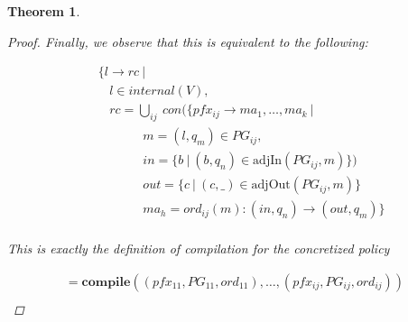 \documentclass[twocolumn]{sig-alternate-10pt}
\newtheorem{thm}{Theorem}[section]
\begin{document}
\begin{thm}
\begin{proof}
  Finally, we observe that this is equivalent to the following:

  \[ \begin{array}{l}
     ~~~~~ \{ l \rightarrow rc ~\vert~ \\
     ~~~~~~~~~ l \in internal(V), \\
     ~~~~~~~~~ rc = \bigcup_{ij}~ con(\{ pfx_{ij} \rightarrow ma_1, \dots, ma_k ~\vert~ \\
     ~~~~~~~~~~~~~~~~~~~~~ m = (l,q_m) \in PG_{ij}, \\
     ~~~~~~~~~~~~~~~~~~~~~ in = \{ b ~\vert~ (b,q_n) \in \text{adjIn}(PG_{ij},m) \}) \\
     ~~~~~~~~~~~~~~~~~~~~~ out = \{ c ~\vert~ (c,\_) \in \text{adjOut}(PG_{ij},m) \} \\
     ~~~~~~~~~~~~~~~~~~~~~ ma_h = ord_{ij}(m) : (in,q_n) \rightarrow (out,q_m) \} \\
  \end{array} \]%

  This is exactly the definition of compilation for the concretized policy

  \[ \begin{array}{l}
     = \textbf{compile}( (pfx_{11},PG_{11},ord_{11}), \dots, (pfx_{ij},PG_{ij},ord_{ij}) ) \\
  \end{array} \]%


  \end{proof}

\end{thm}
\end{document}
